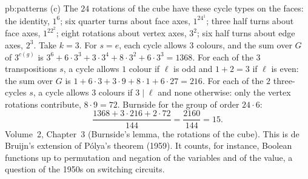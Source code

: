 \begin{solution}{pb:patterns}
(c) The $24$ rotations of the cube have these cycle types on the faces: the identity, $1^6$; six quarter turns about face axes,
$1^24^1$; three half turns about face axes, $1^22^2$; eight rotations about vertex axes, $3^2$; six half turns about edge axes,
$2^3$. Take $k=3$. For $s=e$, each cycle allows $3$ colours, and the sum over $G$ of $3^{c(g)}$ is
$3^6+6\cdot3^3+3\cdot3^4+8\cdot3^2+6\cdot3^3=1368$. For each of the $3$ transpositions $s$, a cycle allows $1$ colour if $\ell$ is
odd and $1+2=3$ if $\ell$ is even: the sum over $G$ is $1+6\cdot3+3\cdot9+8\cdot1+6\cdot27=216$. For each of the $2$ three-cycles
$s$, a cycle allows $3$ colours if $3\mid\ell$ and none otherwise: only the vertex rotations contribute, $8\cdot9=72$. Burnside
for the group of order $24\cdot6$:
\[
\frac{1368+3\cdot216+2\cdot72}{144}=\frac{2160}{144}=15.
\]
\tools Volume~2, Chapter~3 (Burnside's lemma, the rotations of the cube).
\leads This is de Bruijn's extension of Pólya's theorem (1959). It counts, for instance, Boolean functions up to permutation
and negation of the variables and of the value, a question of the 1950s on switching circuits.
\end{solution}

